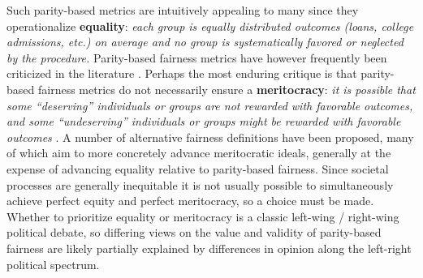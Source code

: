 \documentclass[11pt,dvipdfm]{article}
\begin{document}
Such parity-based metrics are intuitively appealing to many since they operationalize \textbf{equality}: \emph{each group is equally distributed outcomes (loans, college admissions, etc.) on average and no group is systematically favored or neglected by the procedure.}  Parity-based fairness metrics have however frequently been criticized in the literature \cite{dwork2012fairness, hardt2016equality, simoiu2017problem}.  Perhaps the most enduring critique is that parity-based fairness metrics do not necessarily ensure a \textbf{meritocracy}: \emph{it is possible that some ``deserving'' individuals or groups are not rewarded with favorable outcomes, and some ``undeserving'' individuals or groups might be rewarded with favorable outcomes} \cite{hardt2016equality, simoiu2017problem, corbettdavies2018measure}.  A number of alternative fairness definitions have been proposed, many of which aim to more concretely advance meritocratic ideals, generally at the expense of advancing equality relative to parity-based fairness.  Since societal processes are generally inequitable it is not usually possible to simultaneously achieve perfect equity and perfect meritocracy, so a choice must be made.  Whether to prioritize equality or meritocracy is a classic left-wing / right-wing political debate, so differing views on the value and validity of parity-based fairness are likely partially explained by differences in opinion along the left-right political spectrum.
\end{document}
